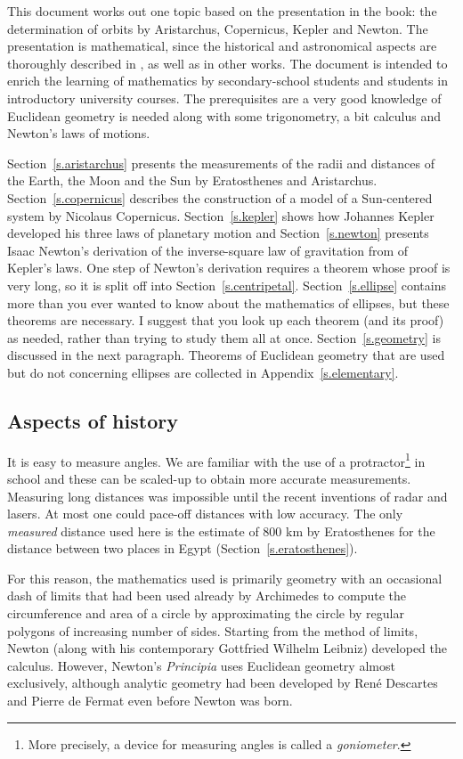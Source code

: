 This document works out one topic based on the presentation in the book: the determination of orbits by Aristarchus, Copernicus, Kepler and Newton. The presentation is mathematical, since the historical and astronomical aspects are thoroughly described in \cite{hahn-cic}, as well as in other works. The document is intended to enrich the learning of mathematics by secondary-school students and students in introductory university courses. The prerequisites are a very good knowledge of Euclidean geometry is needed along with some trigonometry, a bit calculus and Newton's laws of motions.

Section~\ref{s.aristarchus} presents the measurements of the radii and distances of the Earth, the Moon and the Sun by Eratosthenes and Aristarchus. Section~\ref{s.copernicus} describes the construction of a model of a Sun-centered system by Nicolaus Copernicus. Section~\ref{s.kepler} shows how Johannes Kepler developed his three laws of planetary motion and Section~\ref{s.newton} presents Isaac Newton's derivation of the inverse-square law of gravitation from of Kepler's laws. One step of Newton's derivation requires a theorem whose proof is very long, so it is split off into Section~\ref{s.centripetal}. Section~\ref{s.ellipse} contains more than you ever wanted to know about the mathematics of ellipses, but these theorems are necessary. I suggest that you look up each theorem (and its proof) as needed, rather than trying to study them all at once. Section~\ref{s.geometry} is discussed in the next paragraph. Theorems of Euclidean geometry that are used but do not concerning ellipses are collected in Appendix~\ref{s.elementary}.

\subsection*{Aspects of history}

It is easy to measure angles. We are familiar with the use of a protractor\footnote{More precisely, a device for measuring angles is called a \emph{goniometer}.} in school and these can be scaled-up to obtain more accurate measurements. Measuring long distances was impossible until the recent inventions of radar and lasers. At most one could pace-off distances with low accuracy. The only \emph{measured} distance used here is the estimate of $800$ km by Eratosthenes for the distance between two places in Egypt (Section~\ref{s.eratosthenes}).

For this reason, the mathematics used is primarily geometry with an occasional dash of limits that had been used already by Archimedes to compute the circumference and area of a circle by approximating the circle by regular polygons of increasing number of sides. Starting from the method of limits, Newton (along with his contemporary Gottfried Wilhelm Leibniz) developed the calculus. However, Newton's \textit{Principia} uses Euclidean geometry almost exclusively, although analytic geometry had been developed by René Descartes and Pierre de Fermat even before Newton was born.

